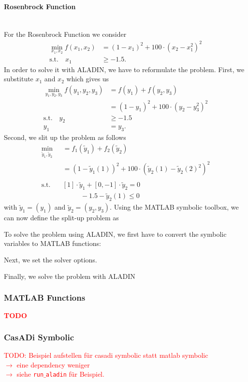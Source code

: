 \documentclass[]{scrartcl}
\begin{document}
\paragraph{Rosenbrock Function} \\
For the Rosenbrock Function we consider
\begin{align*}
\min_{x_1, x_2} f(x_1, x_2) &= (1 - x_1)^2 + 100 \cdot (x_2 - x_1^2)^2 \\
\text{s.t.} \quad x_1 & \geq -1.5.
\end{align*}
In order to solve it with ALADIN, we have to reformulate the problem. First, we substitute $x_1$ and $x_2$ which gives us
\begin{align*}
\min_{y_1, y_2, y_3}f(y_1, y_2, y_3) & = f(y_1) + f(y_2, y_3)\\
 & = (1 - y_1)^2 + 100 \cdot (y_2 - y_3^2)^2 \\
\text{s.t.} \quad y_2 & \geq - 1.5\\
y_1 & = y_3. 
\end{align*}
Second, we slit up the problem as follows
\begin{align*}
\min_{\tilde{y}_1, \tilde{y}_2} &= f_1(\tilde{y}_1) + f_2(\tilde{y}_2) \\
& = (1 - \tilde{y}_1(1))^2 + 100 \cdot (\tilde{y}_2(1) - \tilde{y}_2(2)^2)^2 \\ 
\\
\text{s.t.} \quad & [1] \cdot \tilde{y}_1 + [0, -1] \cdot \tilde{y}_2 = 0 \\
\quad \quad & \quad \quad \text{ } -1.5 - \tilde{y}_2(1) \leq 0
\end{align*}
with $\tilde{y}_1 = (y_1)$ and $\tilde{y}_2 = (y_2, y_3)$.
Using the MATLAB symbolic toolbox, we can now define the split-up problem 
as 

To solve the problem using ALADIN, we first have to convert the symbolic variables to MATLAB functions:

Next, we set the solver options.

Finally, we solve the problem with ALADIN


\subsubsection{MATLAB Functions}
\textcolor{red}{\textbf{TODO}} 
\subsubsection{CasADi Symbolic}
\textcolor{red}{TODO: Beispiel aufstellen für casadi symbolic statt matlab symbolic \\
$\rightarrow$ eine dependency weniger\\
$\rightarrow$ siehe \texttt{run$\_$aladin} für Beispiel.}
\end{document}
